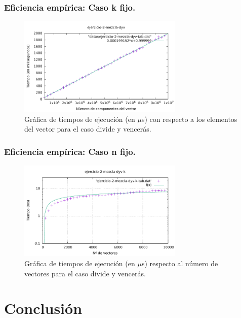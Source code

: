 \documentclass[13pt]{beamer}
\begin{document}
    \begin{frame}
        \frametitle{Eficiencia empírica: Caso k fijo.}

        \begin{figure}
            \includegraphics[width=0.7\textwidth]{../data/2-dyv/ejercicio-2-mezcla-dyv-graph.pdf}
            \caption{Gráfica de tiempos de ejecución (en $\mu$s) con respecto a los elementos del vector para el caso divide y vencerás.}
        \end{figure}
    \end{frame}

    \begin{frame}
        \frametitle{Eficiencia empírica: Caso n fijo.}

        \begin{figure}
            \includegraphics[width=0.7\textwidth]{../data/2-dyv/ejercicio-2-mezcla-dyv-k-graph.pdf}
            \caption{Gráfica de tiempos de ejecución (en $\mu$s) respecto al número de vectores para el caso divide y vencerás.}
        \end{figure}
    \end{frame}


    \section{Conclusión}
\end{document}

